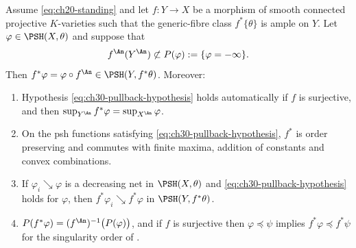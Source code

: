 \begin{theorem}
\label{thm:ch30-pullback-psh}
Assume \eqref{eq:ch20-standing} and let \(f:Y\to X\) be a morphism of smooth
connected projective \(K\)-varieties such that the generic-fibre class
\(f^*\{\theta\}\) is ample on \(Y\).  Let
\(\varphi\in\PSH(X,\theta)\) and suppose that
\begin{equation}
\label{eq:ch30-pullback-hypothesis}
 f^{\An}(Y^{\An})\not\subset P(\varphi):=\{\varphi=-\infty\}.
\end{equation}
Then \(f^*\varphi=\varphi\circ f^{\An}\in\PSH(Y,f^*\theta)\).  Moreover:
\begin{enumerate}
\item\label{itm:ch30-pbpsh:surj}
Hypothesis \eqref{eq:ch30-pullback-hypothesis} holds automatically if
\(f\) is surjective, and then
\(\sup_{Y^{\An}}f^*\varphi=\sup_{X^{\An}}\varphi\).
\item\label{itm:ch30-pbpsh:order}
On the psh functions satisfying
\eqref{eq:ch30-pullback-hypothesis}, \(f^*\) is order preserving and
commutes with finite maxima, addition of constants and convex combinations.
\item\label{itm:ch30-pbpsh:decreasing}
If \(\varphi_i\searrow\varphi\) is a decreasing net in \(\PSH(X,\theta)\)
and \eqref{eq:ch30-pullback-hypothesis} holds for \(\varphi\), then
\(f^*\varphi_i\searrow f^*\varphi\) in \(\PSH(Y,f^*\theta)\).
\item\label{itm:ch30-pbpsh:polar}
\(P(f^*\varphi)=(f^{\An})^{-1}\bigl(P(\varphi)\bigr)\), and if \(f\) is
surjective then \(\varphi\preceq\psi\) implies
\(f^*\varphi\preceq f^*\psi\) for the singularity order of
.
\end{enumerate}
\end{theorem}

